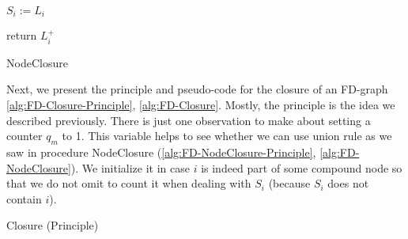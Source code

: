 \newpage

\begin{algorithm}

\BlankLine
\BlankLine	

$S_i := L_i$ \;

return $L_i^+$ \;
\caption{NodeClosure}
\label{alg:FD-NodeClosure}
\end{algorithm}

\vspace{1.2em}

Next, we present the principle and pseudo-code for the closure of an FD-graph
\ref{alg:FD-Closure-Principle}, \ref{alg:FD-Closure}. Mostly, the principle is 
the idea we described previously. There is just one observation to make about 
setting a counter $q_m$ to 1. This variable helps to see whether we can use 
union rule as we saw in procedure NodeClosure 
(\ref{alg:FD-NodeClosure-Principle}, \ref{alg:FD-NodeClosure}). We initialize it
in case $i$ is indeed part of some compound node so that we do not omit to count
it when dealing with $S_i$ (because $S_i$ does not contain $i$). 

\begin{algorithm}

\BlankLine
\BlankLine


\caption{Closure (Principle)}
\label{alg:FD-Closure-Principle}
\end{algorithm}

